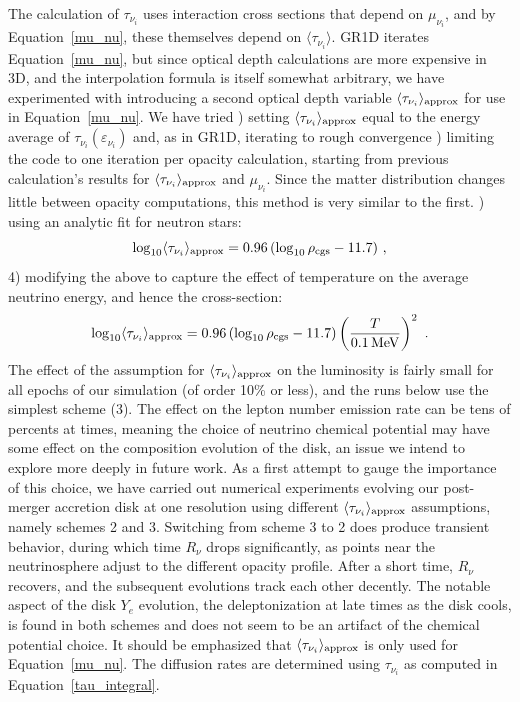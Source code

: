 The calculation of $\tau_{\nu_i}$ uses interaction cross sections
that depend on $\mu_{\nu_i}$, and by Equation~\ref{mu_nu}, these
themselves depend on $\langle\tau_{\nu_i}\rangle$.   GR1D iterates
Equation~\ref{mu_nu}, but since
optical depth calculations are more expensive in 3D, and the
interpolation formula is itself somewhat arbitrary, we have experimented
with introducing a second optical depth variable
$\langle\tau_{\nu_i}\rangle_{\rm approx}$ for use in Equation~\ref{mu_nu}. 
We have tried
) setting $\langle\tau_{\nu_i}\rangle_{\rm approx}$ equal to
the energy average of $\tau_{\nu_i}(\varepsilon_{\nu_i})$ and, as in GR1D, iterating
to rough convergence
) limiting the code to one iteration per opacity calculation, starting
from previous calculation's results for $\langle\tau_{\nu_i}\rangle_{\rm approx}$
and $\mu_{\nu_i}$.  Since the matter distribution changes little between
opacity computations, this method is very similar to the first.
) using an analytic fit for neutron stars: 
\begin{equation}
\label{tau_nu_rho}
\log_{10}\langle\tau_{\nu_i}\rangle_{\rm approx}=0.96\,(\log_{10}\rho_{\rm cgs}-11.7)\ ,
\end{equation}
4) modifying the above to capture the effect of temperature on the
average neutrino energy, and hence the cross-section:
\begin{equation}
\label{tau_nu_rho_and_T}
\log_{10}\langle\tau_{\nu_i}\rangle_{\rm approx}
=0.96\,(\log_{10}\rho_{\rm cgs}-11.7)\left(\frac{T}{0.1{\,\rm MeV}}\right)^2\ .
\end{equation}
The effect of the assumption for $\langle\tau_{\nu_i}\rangle_{\rm approx}$
on the luminosity is
fairly small for all epochs of our simulation (of order 10\% or less),
and the runs below use the simplest scheme (3).  The effect on
the lepton number emission rate can be tens of percents at times,
meaning the choice of neutrino chemical potential may have some effect
on the composition evolution of the disk, an issue we intend to explore
more deeply in future work. As a first attempt to gauge the importance
of this choice, we have carried out numerical experiments evolving our
post-merger accretion disk at one resolution using different
$\langle\tau_{\nu_i}\rangle_{\rm approx}$ assumptions, namely schemes 2 and 3. 
Switching from scheme 3 to 2 does produce transient behavior, during which time
$R_{\nu}$ drops significantly, as points near the neutrinosphere adjust
to the different opacity profile.  After a short time, $R_{\nu}$
recovers, and the subsequent evolutions track each other decently. 
The notable aspect of the disk $Y_e$ evolution, the deleptonization at late
times as the disk cools, is found in both schemes and does not
seem to be an artifact of the chemical potential choice.
It should be emphasized that
$\langle\tau_{\nu_i}\rangle_{\rm approx}$ is only used for Equation~\ref{mu_nu}. 
The diffusion rates are determined using $\tau_{\nu_i}$ as computed in
Equation~\ref{tau_integral}.

